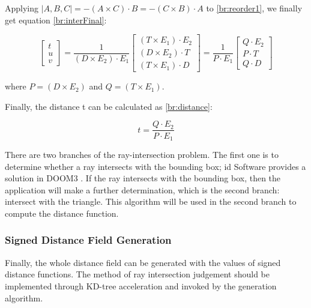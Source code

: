 \hspace*{\fill}

Applying $ |A, B, C|=-(A \times C) \cdot B=-(C \times B) \cdot A $ to \ref{br:reorder1}, we finally get equation \ref{br:interFinal}:

\begin{equation}
    \begin{bmatrix}t
        \\u
        \\v
       \end{bmatrix}
       =\frac{1}{\left (D\times E_{2}\right)\cdot E_{1}}
       \begin{bmatrix}\left( T\times E_{1}\right)\cdot E_{2} 
        \\\left (  D\times E_{2}\right )\cdot T 
        \\\left (  T\times E_{1}\right )\cdot D
       \end{bmatrix}
       =\frac{1}{P\cdot E_{1}} \begin{bmatrix}Q\cdot E_{2} 
        \\P\cdot T 
        \\Q\cdot D
       \end{bmatrix}
    \label{br:interFinal}
\end{equation}

where $ P=\left(D \times E_{2}\right) $ and $ Q=\left(T \times E_{1}\right) $.

Finally, the distance t can be calculated as \ref{br:distance}:

\begin{equation}
    t=\frac{Q\cdot E_{2}}{P\cdot E_{1}}
    \label{br:distance}
\end{equation}

There are two branches of the ray-intersection problem. The first one is to determine whether a ray intersects with the bounding box; id Software provides a solution in DOOM3 \cite{raybound}. If the ray intersects with the bounding box, then the application will make a further determination, which is the second branch: intersect with the triangle. This algorithm will be used in the second branch to compute the distance function.

\subsubsection{Signed Distance Field Generation}

Finally, the whole distance field can be generated with the values of signed distance functions. The method of ray intersection judgement should be implemented through KD-tree acceleration and invoked by the generation algorithm.

